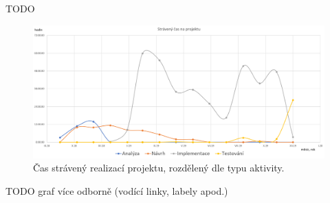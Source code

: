 \begin{conclusion} \label{conclusion}

TODO

\begin{figure}[]
\includegraphics[width=\textwidth]{../png/time/time_spent.png}
\caption[Čas strávený realizací projektu]{Čas strávený realizací projektu, rozdělený dle typu aktivity.} \label{picture:time:spent}
\end{figure}

TODO graf více odborně (vodící linky, labely apod.)

\end{conclusion}
